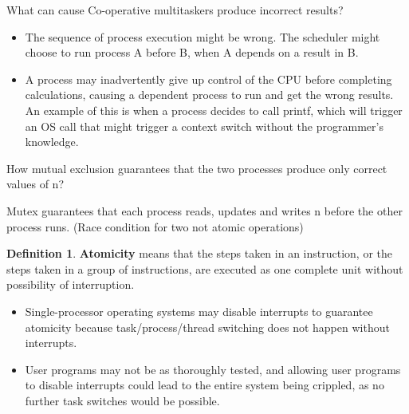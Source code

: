\documentclass[12pt,a4paper]{article}
\theoremstyle{definition}
\newtheorem{definition}{Definition}[section]
\newenvironment{myitemize}
{ \begin{itemize}
    \setlength{\itemsep}{5pt}
    \setlength{\parskip}{0pt}
    \setlength{\parsep}{0pt}     }
{ \end{itemize}                  }
\begin{document}
\begin{tcolorbox}
	\textsf{What can cause Co-operative multitaskers produce incorrect results?}
	
	\begin{myitemize}
		\item The sequence of process execution might be wrong. The scheduler might choose to run process A before B, when A depends on a result in B.
		\item A process may inadvertently give up control of the CPU before completing calculations, causing a dependent process to run and get the wrong results. An example of this is when a process decides to call \textsf{printf}, which will trigger an OS call that might trigger a context switch without the programmer’s knowledge.
	\end{myitemize}

\end{tcolorbox}

\begin{tcolorbox}
	\textsf{How mutual exclusion guarantees that the two processes produce only correct values of n?}
	
	Mutex guarantees that each process reads, updates and writes n before the other process runs. (Race condition for two not atomic operations)
\end{tcolorbox}

\begin{definition}{\textbf{Atomicity}}
	means that the steps taken in an instruction, or the steps taken in a group of instructions, are executed as one complete unit without possibility of interruption.
	\begin{myitemize}
		\item Single-processor operating systems may disable interrupts to guarantee atomicity because task/process/thread switching does not happen without interrupts.
		\item User programs may not be as thoroughly tested, and allowing user programs to disable interrupts could lead to the entire system being crippled, as no further task switches would be possible.
	\end{myitemize}
\end{definition}
\end{document}
